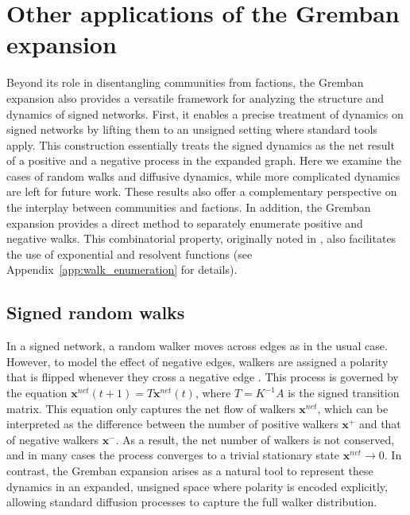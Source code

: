 \documentclass[reprint,onecolumn]{article}
\newcommand{\1}{\mathbb{1}}
\newcommand{\x}{\mathbf{x}}
\newcommand{\0}{\mathbf{0}}
\begin{document}
\section{Other applications of the Gremban expansion}\label{sec:other_applications}

Beyond its role in disentangling communities from factions, the Gremban expansion also provides a versatile framework for analyzing the structure and dynamics of signed networks. First, it enables a precise treatment of dynamics on signed networks by lifting them to an unsigned setting where standard tools apply. This construction essentially treats the signed dynamics as the net result of a positive and a negative process in the expanded graph. Here we examine the cases of random walks and diffusive dynamics, while more complicated dynamics are left for future work. These results also offer a complementary perspective on the interplay between communities and factions. In addition, the Gremban expansion provides a direct method to separately enumerate positive and negative walks. This combinatorial property, originally noted in \cite{fox2017numerical}, also facilitates the use of exponential and resolvent functions (see Appendix~\ref{app:walk_enumeration} for details).
%
\subsection{Signed random walks}

In a signed network, a random walker moves across edges as in the usual case. However, to model the effect of negative edges, walkers
are assigned a polarity that is flipped whenever they cross a negative edge \cite{tian2024spreading}. This process is governed by the equation $\x^{net}(t+1)=T\x^{net}(t)$, where $T =  K^{-1}A$ is the signed transition matrix. This equation only captures the net flow of walkers $\x^{net}$, which can be interpreted as the difference between the number of positive walkers $\mathbf{x}^+$ and that of negative walkers $\mathbf{x}^-$. As a result, the net number of walkers is not conserved, and in many cases the process converges to a trivial stationary state $\mathbf{x}^{net}\to0$. In contrast, the Gremban expansion arises as a natural tool to represent these dynamics in an expanded, unsigned space where polarity is encoded explicitly, allowing standard diffusion processes to capture the full walker distribution. 
\end{document}

